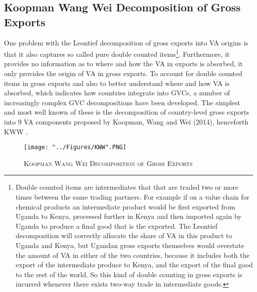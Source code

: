 \documentclass[a4paper]{article}
\begin{document}
\subsection{Koopman Wang Wei Decomposition of Gross Exports}
One problem with the Leontief decomposition of gross exports into VA origins is that it also captures so called pure double counted items\footnote{Double counted items are intermediates that that are traded two or more times between the same trading partners. For example if on a value chain for chemical products an intermediate product would be first exported from Uganda to Kenya, processed further in Kenya and then imported again by Uganda to produce a final good that is the exported. The Leontief decomposition will correctly allocate the share of VA in this product to Uganda and Kenya, but Ugandan gross exports themselves would overstate the amount of VA in either of the two countries, because it includes both the export of the intermediate produce to Kenya, and the export of the final good to the rest of the world. So this kind of double counting in gross exports is incurred whenever there exists two-way trade in intermediate goods.}. %
Furthermore, it provides no information as to where and how the VA in exports is absorbed, it only provides the origin of VA in gross exports. To account for double counted items in gross exports and also to better understand where and how VA is absorbed, which indicates how countries integrate into GVCs, a number of increasingly complex GVC decompositions have been developed. The simplest and most well known of these is the decomposition of country-level gross exports into 9 VA components proposed by Koopman, Wang and Wei (2014), henceforth KWW \citep{koopman2014tracing}.

\begin{figure}[h!]
\centering
\caption{\label{fig:KWW}\textsc{Koopman Wang Wei Decomposition of Gross Exports}}
\texttt{[image: "../Figures/KWW".PNG]} %
\end{figure}
\FloatBarrier
\end{document}
